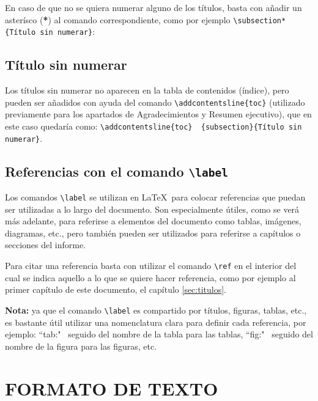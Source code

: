 \documentclass[a4paper, 11pt, spanish, twoside]{article}
\begin{document}
En caso de que no se quiera numerar alguno de los títulos, basta con añadir un asterísco (\textbf{*}) al comando correspondiente, como por ejemplo \texttt{\textbackslash subsection*\{Título sin numerar\}}:


\subsection*{Título sin numerar} 

Los títulos sin numerar no aparecen en la tabla de contenidos (índice), pero pueden ser añadidos con ayuda del comando \texttt{\textbackslash addcontentsline\{toc\}} (utilizado previamente para los apartados de Agradecimientos y Resumen ejecutivo), que en este caso quedaría como: \texttt{\textbackslash addcontentsline\{toc\} \ \{subsection\}\{Título sin numerar\}}.


\subsection{Referencias con el comando \texttt{\textbackslash label}} \label{sec:referencias}

Los comandos \texttt{\textbackslash label} se utilizan en \LaTeX \ para colocar referencias que puedan ser utilizadas a lo largo del documento. Son especialmente útiles, como se verá más adelante, para referirse a elementos del documento como tablas, imágenes, diagramas, etc., pero también pueden ser utilizados para referirse a capítulos o secciones del informe. 

Para citar una referencia basta con utilizar el comando \texttt{\textbackslash ref} en el interior del cual se indica aquello a lo que se quiere hacer referencia, como por ejemplo al primer capítulo de este documento, el capítulo \ref{sec:titulos}.

\textbf{Nota:} ya que el comando \texttt{\textbackslash label} es compartido por títulos, figuras, tablas, etc., es bastante útil utilizar una nomenclatura clara para definir cada referencia, por ejemplo: ``tab:" \ seguido del nombre de la tabla para las tablas, ``fig:" \ seguido del nombre de la figura para las figuras, etc.




\newpage
\section{FORMATO DE TEXTO} \label{sec:formato}
\end{document}
